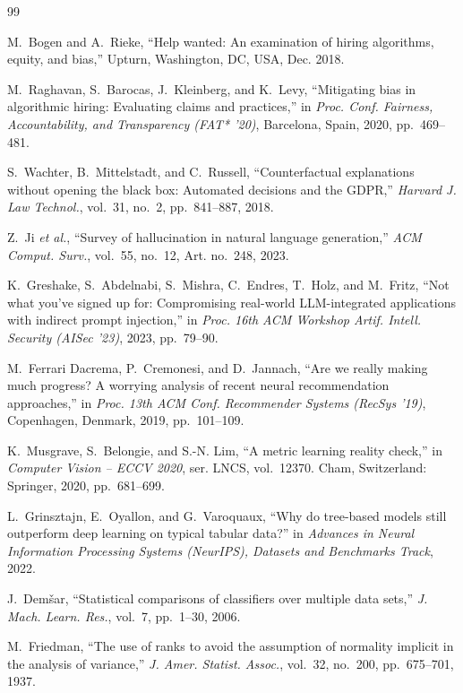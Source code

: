 \documentclass[conference,a4paper]{IEEEtran}
\begin{document}
\balance
\begin{thebibliography}{99}

M.~Bogen and A.~Rieke, ``Help wanted: An examination of hiring algorithms,
equity, and bias,'' Upturn, Washington, DC, USA, Dec. 2018.

M.~Raghavan, S.~Barocas, J.~Kleinberg, and K.~Levy, ``Mitigating bias in
algorithmic hiring: Evaluating claims and practices,'' in \emph{Proc. Conf.
Fairness, Accountability, and Transparency (FAT* '20)}, Barcelona, Spain,
2020, pp.~469--481.

S.~Wachter, B.~Mittelstadt, and C.~Russell, ``Counterfactual explanations
without opening the black box: Automated decisions and the GDPR,''
\emph{Harvard J. Law Technol.}, vol.~31, no.~2, pp.~841--887, 2018.

Z.~Ji \emph{et al.}, ``Survey of hallucination in natural language
generation,'' \emph{ACM Comput. Surv.}, vol.~55, no.~12, Art. no.~248, 2023.

K.~Greshake, S.~Abdelnabi, S.~Mishra, C.~Endres, T.~Holz, and M.~Fritz, ``Not
what you've signed up for: Compromising real-world LLM-integrated applications
with indirect prompt injection,'' in \emph{Proc. 16th ACM Workshop Artif.
Intell. Security (AISec '23)}, 2023, pp.~79--90.

M.~Ferrari Dacrema, P.~Cremonesi, and D.~Jannach, ``Are we really making much
progress? A worrying analysis of recent neural recommendation approaches,'' in
\emph{Proc. 13th ACM Conf. Recommender Systems (RecSys '19)}, Copenhagen,
Denmark, 2019, pp.~101--109.

K.~Musgrave, S.~Belongie, and S.-N. Lim, ``A metric learning reality check,''
in \emph{Computer Vision -- ECCV 2020}, ser. LNCS, vol.~12370. Cham,
Switzerland: Springer, 2020, pp.~681--699.

L.~Grinsztajn, E.~Oyallon, and G.~Varoquaux, ``Why do tree-based models still
outperform deep learning on typical tabular data?'' in \emph{Advances in
Neural Information Processing Systems (NeurIPS), Datasets and Benchmarks
Track}, 2022.

J.~Dem\v{s}ar, ``Statistical comparisons of classifiers over multiple data
sets,'' \emph{J. Mach. Learn. Res.}, vol.~7, pp.~1--30, 2006.

M.~Friedman, ``The use of ranks to avoid the assumption of normality implicit
in the analysis of variance,'' \emph{J. Amer. Statist. Assoc.}, vol.~32,
no.~200, pp.~675--701, 1937.


\end{thebibliography}
\end{document}
